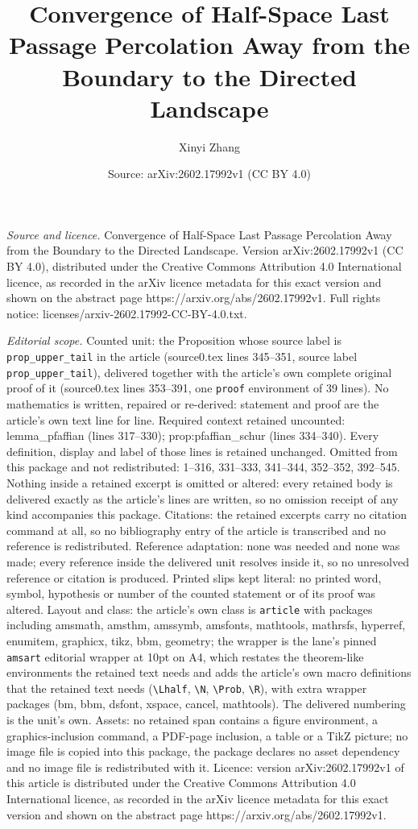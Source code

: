 \documentclass[10pt,a4paper]{amsart}
\title[Convergence of Half-Space Last Passage Percolation Away from]{Convergence of Half-Space Last Passage Percolation Away from the Boundary to the Directed Landscape}
\author{Xinyi Zhang}
\date{Source: arXiv:2602.17992v1 (CC BY 4.0)}
\begin{document}
\maketitle

\noindent\emph{Source and licence.} Convergence of Half-Space Last Passage Percolation Away from the Boundary to the Directed Landscape. Version arXiv:2602.17992v1 (CC BY 4.0), distributed under the Creative Commons Attribution 4.0 International licence, as recorded in the arXiv licence metadata for this exact version and shown on the abstract page https://arxiv.org/abs/2602.17992v1. Full rights notice: licenses/arxiv-2602.17992-CC-BY-4.0.txt.\par\smallskip

\noindent\textit{Editorial scope.} Counted unit: the Proposition whose source label is \texttt{prop\_upper\_tail} in the article (source0.tex lines 345--351, source label \texttt{prop\_upper\_tail}), delivered together with the article's own complete original proof of it (source0.tex lines 353--391, one \texttt{proof} environment of 39 lines). No mathematics is written, repaired or re-derived: statement and proof are the article's own text line for line. Required context retained uncounted: lemma\_pfaffian (lines 317--330); prop:pfaffian\_schur (lines 334--340). Every definition, display and label of those lines is retained unchanged. Omitted from this package and not redistributed: 1--316, 331--333, 341--344, 352--352, 392--545. Nothing inside a retained excerpt is omitted or altered: every retained body is delivered exactly as the article's lines are written, so no omission receipt of any kind accompanies this package. Citations: the retained excerpts carry no citation command at all, so no bibliography entry of the article is transcribed and no reference is redistributed. Reference adaptation: none was needed and none was made; every reference inside the delivered unit resolves inside it, so no unresolved reference or citation is produced. Printed slips kept literal: no printed word, symbol, hypothesis or number of the counted statement or of its proof was altered. Layout and class: the article's own class is \texttt{article} with packages including amsmath, amsthm, amssymb, amsfonts, mathtools, mathrsfs, hyperref, enumitem, graphicx, tikz, bbm, geometry; the wrapper is the lane's pinned \texttt{amsart} editorial wrapper at 10pt on A4, which restates the theorem-like environments the retained text needs and adds the article's own macro definitions that the retained text needs (\texttt{\textbackslash Lhalf}, \texttt{\textbackslash N}, \texttt{\textbackslash Prob}, \texttt{\textbackslash R}), with extra wrapper packages (bm, bbm, dsfont, xspace, cancel, mathtools). The delivered numbering is the unit's own. Assets: no retained span contains a figure environment, a graphics-inclusion command, a PDF-page inclusion, a table or a TikZ picture; no image file is copied into this package, the package declares no asset dependency and no image file is redistributed with it. Licence: version arXiv:2602.17992v1 of this article is distributed under the Creative Commons Attribution 4.0 International licence, as recorded in the arXiv licence metadata for this exact version and shown on the abstract page https://arxiv.org/abs/2602.17992v1. 
\end{document}
